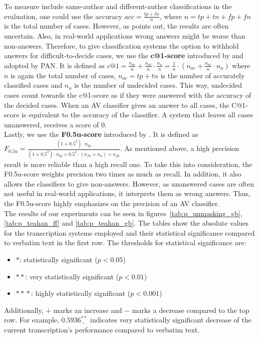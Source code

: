 To measure include same-author and different-author classifications in the evaluation, one could use the accuracy $acc = \frac{tp+tn}{n}$, where $n = tp+tn+fp+fn$ is the total number of cases.
However, as \cite{bevendorff2019unmaskingShortTexts} points out, the results are often uncertain.
Also, in real-world applications wrong answers might be worse than non-answers.
Therefore, to give classification systems the option to withhold answers for difficult-to-decide cases, we use the \textbf{c@1-score} introduced by \cite{penas2011c_at_1} and adopted by PAN.
It is defined as $c@1 = \frac{n_{ac}}{n}+\frac{n_{ac}}{n}\cdot{}\frac{n_u}{n} = \frac{1}{n}\cdot{}\left(n_{ac}+\frac{n_{ac}}{n}\cdot{}n_u\right)$ where $n$ is again the total number of cases, $n_{ac} = tp+tn$ is the number of accurately classified cases and $n_u$ is the number of undecided cases.
This way, undecided cases count towards the c@1-score as if they were answered with the accuracy of the decided cases.
When an AV classifier gives an answer to all cases, the C@1-score is equivalent to the accuracy of the classifier.
A system that leaves all cases unanswered, receives a score of 0.\\
Lastly, we use the \textbf{F0.5u-score} introduced by \cite{bevendorff2019unmaskingShortTexts}.
It is defined as $F_{0.5u} = \frac{(1+0.5^2)\cdot{}n_{tp}}{(1+0.5^2)\cdot{}n_{tp}+0.5^2\cdot{}(n_{fn}+n_u)+n_{fp}}$.
As mentioned above, a high precision result is more reliable than a high recall one.
To take this into consideration, the F0.5u-score weights precision two times as much as recall.
In addition, it also allows the classifiers to give non-answers.
However, as unanswered cases are often not useful in real-world applications, it interprets them as wrong answers.
Thus, the F0.5u-score highly emphasizes on the precision of an AV classifier.\\



The results of our experiments can be seen in figures~\ref{tab:p_unmasking_gb}, \ref{tab:p_teahan_ff} and \ref{tab:p_teahan_gb}.
The tables show the absolute values for the transcription systems employed and their statistical significance compared to verbatim text in the first row.
The thresholds for statistical significance are:
\begin{itemize}
    \item $*$: statistically significant ($p < 0.05$)
    \item $*\! *$: very statistically significant ($p < 0.01$)
    \item $*\! *\! *$: highly statistically significant ($p < 0.001$)
\end{itemize}
Additionally, $+$ marks an increase and $-$ marks a decrease compared to the top row.
For example, $0.5936^{*\! *}_{-}$ indicates very statistically significant decrease of the current transcription's performance compared to verbatim text.


